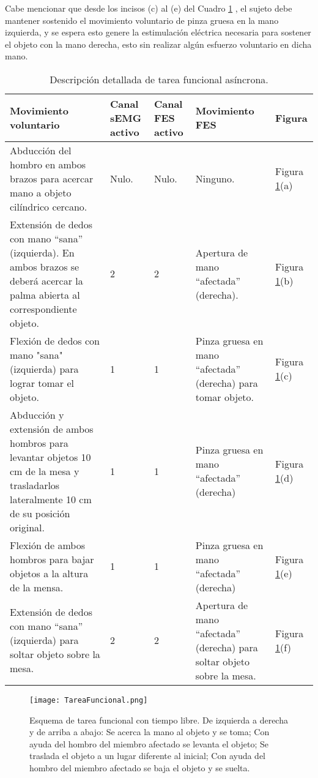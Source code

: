 Cabe mencionar que desde los incisos (c) al (e) del Cuadro \ref{Cuadro:TareaFunAsin} , el sujeto debe mantener sostenido el movimiento voluntario de pinza gruesa en la mano izquierda, y se espera esto genere la estimulación eléctrica necesaria para sostener el objeto con la mano derecha, esto sin realizar algún esfuerzo voluntario en dicha mano.

\begin{table}[htbp]
	\centering
	\begin{tabular}{|p{5cm}|p{1.4cm}|p{1.4cm}|p{3.5cm}|p{1.5cm}|}
	\hline
	\textbf{Movimiento voluntario} & \textbf{Canal sEMG activo} & \textbf{Canal FES activo} & \textbf{Movimiento FES} & \textbf{Figura}\\ \hline \hline
	Abducción del hombro en ambos brazos para acercar mano a objeto cilíndrico cercano. & Nulo. & Nulo. & Ninguno. & Figura \ref{Figura: TareaFuncional_P}(a)\\ \hline
	Extensión de dedos con mano ``sana'' (izquierda). En ambos brazos se deberá acercar la palma abierta al correspondiente objeto. & 2 & 2 & Apertura de mano ``afectada'' (derecha). & Figura \ref{Figura: TareaFuncional_P}(b)\\ \hline
	Flexión de dedos con mano "sana" (izquierda) para lograr tomar el objeto. & 1 & 1 & Pinza gruesa en mano ``afectada'' (derecha) para tomar objeto. & Figura \ref{Figura: TareaFuncional_P}(c)\\ \hline
	Abducción y extensión de ambos hombros para levantar objetos 10 cm de la mesa y trasladarlos lateralmente 10 cm de su posición original. & 1 & 1 & Pinza gruesa en mano ``afectada'' (derecha) & Figura \ref{Figura: TareaFuncional_P}(d)\\ \hline
	Flexión de ambos hombros para bajar objetos a la altura de la mensa. & 1 & 1 & Pinza gruesa en mano ``afectada'' (derecha) & Figura \ref{Figura: TareaFuncional_P}(e)\\ \hline
	Extensión de dedos con mano ``sana'' (izquierda) para soltar objeto sobre la mesa. & 2 & 2 & Apertura de mano ``afectada'' (derecha) para soltar objeto sobre la mesa. & Figura \ref{Figura: TareaFuncional_P}(f)\\ \hline
	\end{tabular}
	\caption{Descripción detallada de tarea funcional asíncrona.}
	\label{Cuadro:TareaFunAsin}
\end{table}

\begin{figure}[htbp]
	\centering
	\texttt{[image: TareaFuncional.png]}
	\caption[Esquema de tarea funcional con tiempo libre.]{Esquema de tarea funcional con tiempo libre. De izquierda a derecha y de arriba a abajo: Se acerca la mano al objeto y se toma; Con ayuda del hombro del miembro afectado se levanta el objeto; Se traslada el objeto a un lugar diferente al inicial; Con ayuda del hombro del miembro afectado se baja el objeto y se suelta.}
	\label{Figura: TareaFuncional_P}
\end{figure}


